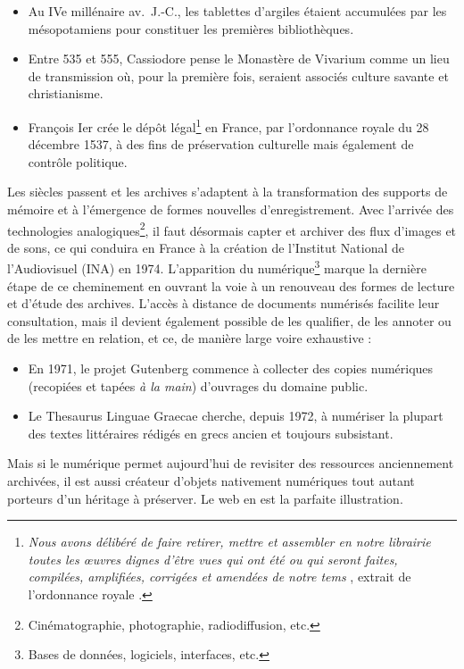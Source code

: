 \documentclass[symmetric,justified,marginals=raggedouter]{tufte-book}
\begin{document}
\begin{itemize}[leftmargin=*]  
\item Au IVe millénaire av.~J.-C., les tablettes d'argiles étaient accumulées par les mésopotamiens pour constituer les premières bibliothèques.
\item Entre 535 et 555, Cassiodore pense le Monastère de Vivarium comme un lieu de transmission où, pour la première fois, seraient associés culture savante et christianisme.
\item François Ier crée le dépôt légal\footnote{\RaggedOuter \RaggedOuter\og \textit{Nous avons délibéré de faire retirer, mettre et assembler en notre librairie toutes les œuvres dignes d'être vues qui ont été ou qui seront faites, compilées, amplifiées, corrigées et amendées de notre tems} \fg{}, extrait de l'ordonnance royale \citep{dougnac_depot_1960}.} en France, par l'ordonnance royale du 28 décembre 1537, à des fins de préservation culturelle mais également de contrôle politique.
\end{itemize}

\noindent Les siècles passent et les archives s'adaptent à la transformation des supports de mémoire et à l'émergence de formes nouvelles d'enre\-gistrement. Avec l'arrivée des technologies analogiques\footnote{\RaggedOuter Cinématographie, photographie, radiodiffusion, etc.}, il faut désormais capter et archiver des flux d'images et de sons, ce qui conduira en France à la création de l'Institut National de l'Audiovisuel (INA) en 1974. L'apparition du numérique\footnote{\RaggedOuter Bases de données, logiciels, interfaces, etc.} marque la dernière étape de ce cheminement en ouvrant la voie à un renouveau des formes de lecture et d'étude des archives. L'accès à distance de documents numérisés facilite leur consultation, mais il devient également possible de les qualifier, de les annoter ou de les mettre en relation, et ce, de manière large voire exhaustive \citep{borgman_digital_2000} :

\begin{itemize}[leftmargin=*]  
\item En 1971, le projet Gutenberg commence à collecter des copies numéri\-ques (recopiées et tapées \textit{à la main}) d'ouvrages du domaine public.
\item Le Thesaurus Linguae Graecae cherche, depuis 1972, à numériser la plupart des textes littéraires rédigés en grecs ancien et toujours subsistant.
\end{itemize}

\noindent Mais si le numérique permet aujourd'hui de revisiter des ressources anciennement archivées, il est aussi créateur d'objets nativement numé\-riques tout autant porteurs d'un héritage à préserver. Le web en est la parfaite illustration.
\end{document}
